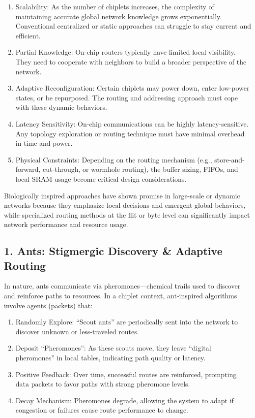 \documentclass[../../../OAE-SPEC-MAIN.tex]{subfiles}
\begin{document}
\begin{enumerate}

\item  Scalability: As the number of chiplets increases, the complexity of maintaining accurate global network knowledge grows exponentially. Conventional centralized or static approaches can struggle to stay current and efficient.
\item  Partial Knowledge: On-chip routers typically have limited local visibility. They need to cooperate with neighbors to build a broader perspective of the network.
\item  Adaptive Reconfiguration: Certain chiplets may power down, enter low-power states, or be repurposed. The routing and addressing approach must cope with these dynamic behaviors.
\item  Latency Sensitivity: On-chip communications can be highly latency-sensitive. Any topology exploration or routing technique must have minimal overhead in time and power.
\item  Physical Constraints: Depending on the routing mechanism (e.g., store-and-forward, cut-through, or wormhole routing), the buffer sizing, FIFOs, and local SRAM usage become critical design considerations.
	
\end{enumerate}

Biologically inspired approaches have shown promise in large-scale or dynamic networks because they emphasize local decisions and emergent global behaviors, while specialized routing methods at the flit or byte level can significantly impact network performance and resource usage.

\subsection{1. Ants: Stigmergic Discovery \& Adaptive Routing}

In nature, ants communicate via pheromones—chemical trails used to discover and reinforce paths to resources. In a chiplet context, ant-inspired algorithms involve agents (packets) that:

\begin{enumerate}
\item  Randomly Explore: “Scout ants” are periodically sent into the network to discover unknown or less-traveled routes.
\item  Deposit “Pheromones”: As these scouts move, they leave “digital pheromones” in local tables, indicating path quality or latency.
\item  Positive Feedback: Over time, successful routes are reinforced, prompting data packets to favor paths with strong pheromone levels.
\item  Decay Mechanism: Pheromones degrade, allowing the system to adapt if congestion or failures cause route performance to change.
\end{enumerate}
	
\end{document}
